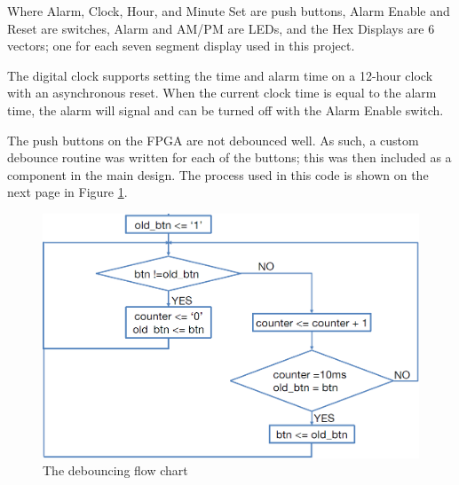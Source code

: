\documentclass[12pt]{article}
\begin{document}
Where Alarm, Clock, Hour, and Minute Set are push buttons, Alarm Enable and Reset are switches, Alarm and AM/PM are LEDs, and the Hex Displays are 6 vectors; one for each seven segment display used in this project.

\vspace{14.5pt}

The digital clock supports setting the time and alarm time on a 12-hour clock with an asynchronous reset.  When the current clock time is equal to the alarm time, the alarm will signal and can be turned off with the Alarm Enable switch.\par
The push buttons on the FPGA are not debounced well.  As such, a custom debounce routine was written for each of the buttons; this was then included as a component in the main design.  The process used in this code is shown on the next page in Figure \ref{fig:debounce}.

\newpage

\begin{figure}[H]
\setlength{\belowcaptionskip}{-10pt}
\begin{center}
\includegraphics[scale=0.5]{debounce_algorithm.png}
\caption{The debouncing flow chart}
\label{fig:debounce}
\end{center}
\end{figure}
\end{document}
